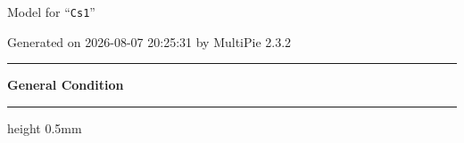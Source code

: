 \documentclass[fleqn,10pt,landscape]{jsarticle}
\begin{document}
\setcounter{MaxMatrixCols}{32}

\renewcommand{\tablename}{Table~}
\renewcommand{\figurename}{Figure~}
\setlength{\baselineskip}{16pt}
\setlength{\parindent}{0pt}
\setlength{\mathindent}{0pt}
\footnotesize
\begin{center}
\LARGE
Model for ``\texttt{Cs1}''
\end{center}
\begin{flushright}
Generated on 2026-08-07 20:25:31 by MultiPie 2.3.2
\end{flushright}
\setlength{\baselineskip}{16pt}
\footnotesize
\vspace{5mm}
\noindent \rule[0.5mm]{5mm}{0.5mm}\hspace{3mm}\textbf{General Condition}\hspace{3mm}\leaders\hrule height 0.5mm\hfill\kern0pt
\vspace{3mm}
\end{document}
